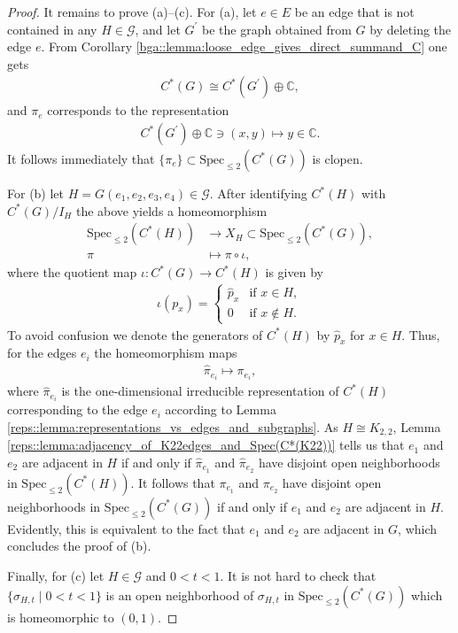 \documentclass[a4paper]{amsart}
\newcommand{\C}{\mathbb{C}}
\begin{document}
\begin{proof}
    It remains to prove (a)--(c). For (a), let $e \in E$ be an edge that is not contained in any $H \in \mathcal{G}$, and let $G^\prime$ be the graph obtained from $G$ by deleting the edge $e$. From Corollary \ref{bga::lemma:loose_edge_gives_direct_summand_C} one gets
    \begin{align*}
        C^\ast(G) \cong C^\ast(G^\prime) \oplus \C,
    \end{align*}
    and $\pi_e$ corresponds to the representation
    \begin{align*}
        C^\ast(G^\prime) \oplus \C \ni (x,y) \mapsto y \in \C.
    \end{align*}
    It follows immediately that $\{\pi_e\} \subset \mathrm{Spec}_{\leq 2}(C^\ast(G))$ is clopen.

    For (b) let $H = G(e_1, e_2, e_3, e_4) \in \mathcal{G}$. After identifying $C^\ast(H)$ with $C^\ast(G) / I_H$ the above yields a homeomorphism
    \begin{align*}
        \mathrm{Spec}_{\leq 2}(C^\ast(H)) &\to X_H \subset \mathrm{Spec}_{\leq 2}(C^\ast(G)), \\
        \pi &\mapsto \pi \circ \iota,
    \end{align*}
    where the quotient map $\iota: C^\ast(G) \to C^\ast(H)$ is given by
    \begin{align*}
        \iota(p_x) = 
        \begin{cases}
            \hat{p}_x & \text{if } x \in H, \\
            0 & \text{if } x \not\in H.
        \end{cases}
    \end{align*}
    To avoid confusion we denote the generators of $C^\ast(H)$ by $\hat{p}_x$ for $x \in H$. Thus, for the edges $e_i$ the homeomorphism maps
    \begin{align*}
        \hat{\pi}_{e_i} \mapsto \pi_{e_i},
    \end{align*}
    where $\hat{\pi}_{e_i}$ is the one-dimensional irreducible representation of $C^\ast(H)$ corresponding to the edge $e_i$ according to Lemma \ref{reps::lemma:representations_vs_edges_and_subgraphs}. As $H \cong K_{2,2}$, Lemma \ref{reps::lemma:adjacency_of_K22edges_and_Spec(C*(K22))} tells us that $e_1$ and $e_2$ are adjacent in $H$ if and only if $\hat{\pi}_{e_1}$ and $\hat{\pi}_{e_2}$ have disjoint open neighborhoods in $\mathrm{Spec}_{\leq 2}(C^\ast(H))$. It follows that $\pi_{e_1}$ and $\pi_{e_2}$ have disjoint open neighborhoods in $\mathrm{Spec}_{\leq 2}(C^\ast(G))$ if and only if $e_1$ and $e_2$ are adjacent in $H$. Evidently, this is equivalent to the fact that $e_1$ and $e_2$ are adjacent in $G$, which concludes the proof of (b).

    Finally, for (c) let $H \in \mathcal{G}$ and $0 < t < 1$. It is not hard to check that $\{\sigma_{H,t} \mid 0 < t < 1\}$ is an open neighborhood of $\sigma_{H,t}$ in $\mathrm{Spec}_{\leq 2}(C^\ast(G))$ which is homeomorphic to $(0,1)$.
\end{proof}
\end{document}
